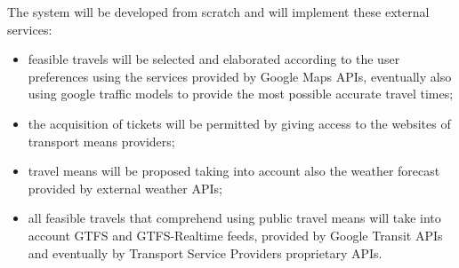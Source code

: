 The system will be developed from scratch and will implement these external services:
\begin{itemize}
\item feasible travels will be selected and elaborated according to the user preferences using the services provided by Google Maps APIs, eventually also using google traffic models to provide the most possible accurate travel times;
\item the acquisition of tickets will be permitted by giving access to the websites of transport means providers;
\item travel means will be proposed taking into account also the weather forecast provided by external weather APIs;
\item all feasible travels that comprehend using public travel means will take into account GTFS and GTFS-Realtime feeds, provided by Google Transit APIs and eventually by Transport Service Providers proprietary APIs.
\end{itemize}